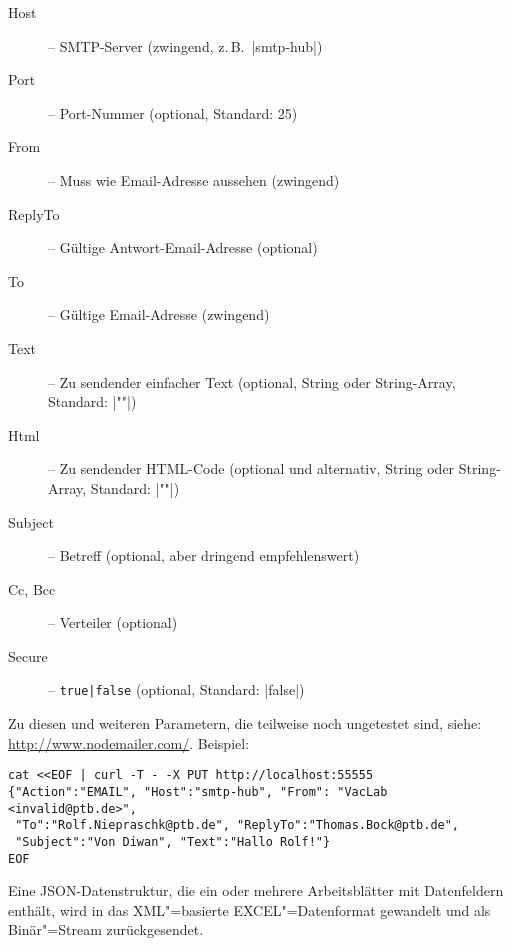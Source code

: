\documentclass[titlepage=false,toc=nobibliography]{vl-report}
\newcommand*\action[1]{\fbox{\nolinkurl{#1}}\medskip\par}
\begin{document}
\begin{description}
\begin{description}
\begin{description}
        \item[Host] -- SMTP-Server (zwingend, z.\,B.\ |smtp-hub|)

        \item[Port] -- Port-Nummer (optional, Standard: 25)

        \item[From] -- Muss wie Email-Adresse aussehen (zwingend)
        
        \item[ReplyTo] -- Gültige Antwort-Email-Adresse (optional)

        \item[To] -- Gültige Email-Adresse (zwingend)

        \item[Text] -- Zu sendender einfacher Text (optional, 
          String oder String-Array, Standard: |""|)
        
        \item[Html] -- Zu sendender HTML-Code (optional und alternativ, 
          String oder String-Array, Standard: |""|)
        
        \item[Subject] -- Betreff (optional, aber dringend empfehlenswert)

        \item[Cc, Bcc] -- Verteiler (optional)
        
        \item[Secure] -- \verb+true|false+ (optional, Standard: |false|)

      \end{description}

      \noindent Zu diesen und weiteren Parametern, die teilweise noch ungetestet 
      sind, siehe: \url{http://www.nodemailer.com/}. Beispiel:
\begin{lstlisting}[language={}]
cat <<EOF | curl -T - -X PUT http://localhost:55555
{"Action":"EMAIL", "Host":"smtp-hub", "From": "VacLab <invalid@ptb.de>", 
 "To":"Rolf.Niepraschk@ptb.de", "ReplyTo":"Thomas.Bock@ptb.de",
 "Subject":"Von Diwan", "Text":"Hallo Rolf!"}
EOF
\end{lstlisting}

    \item \action{XLSX-OUT}

      \noindent Eine JSON-Datenstruktur, die ein oder mehrere Arbeitsblätter
      mit Datenfeldern enthält, wird in das XML"=basierte EXCEL"=Datenformat
      gewandelt und als Binär"=Stream zurückgesendet.


\end{description}
\end{description}
\end{document}
